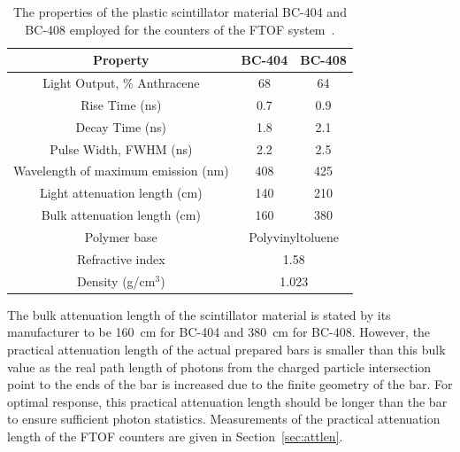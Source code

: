 \documentclass{elsart}
\begin{document}
\begin{table}[htbp]
\begin{center}
\begin{tabular}{c|c|c} \hline
Property                                    & BC-404     & BC-408  \\ \hline    
Light Output, \% Anthracene  & 68             &  64    \\ \hline
Rise Time (ns)                           & 0.7             & 0.9    \\ \hline
Decay Time (ns)                         & 1.8             & 2.1     \\ \hline
Pulse Width, FWHM (ns)         & 2.2              & 2.5    \\ \hline
Wavelength of maximum emission (nm) & 408    & 425 \\ \hline
Light attenuation length (cm)   & 140             & 210   \\ \hline
Bulk attenuation length (cm)     & 160             & 380  \\ \hline
Polymer base                             & \multicolumn{2}{c}{Polyvinyltoluene} \\ \hline
Refractive index                       & \multicolumn{2}{c}{1.58}                    \\ \hline 
Density (g/cm$^3$)                  & \multicolumn{2}{c}{1.023}                    \\ \hline 
\end{tabular}
\end{center}
\caption{The properties of the plastic scintillator material BC-404 and BC-408 employed for the counters
of the FTOF system~\cite{scint-mat-ref}.}
\label{scint-specs}
\end{table}

The bulk attenuation length of the scintillator material is stated by its manufacturer to be 160~cm for
BC-404 and 380~cm for BC-408. However, the practical attenuation length of the actual prepared bars
is smaller than this bulk value as the real path length of photons from the charged particle intersection
point to the ends of the bar is increased due to the finite geometry of the bar. For optimal response, this
practical attenuation length should be longer than the bar to ensure sufficient photon statistics.
Measurements of the practical attenuation length of the FTOF counters are given in Section~\ref{sec:attlen}.
\end{document}
